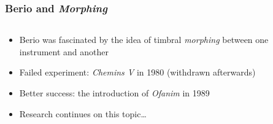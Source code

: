 \begin{frame}
    \frametitle<+- | alert@+->{Berio and \emph{Morphing}}

    \begin{columns}[T]
        \begin{column}{0.7\textwidth}
            \begin{itemize}[<+- | alert@+->]
								\item Berio was fascinated by the idea of timbral \emph{morphing}
												between one instrument and another
								\item Failed experiment: \emph{Chemins V} in 1980 (withdrawn afterwards)
								\item Better success: the introduction of \emph{Ofanim} in 1989
								\item Research continues on this topic\ldots
            \end{itemize}
        \end{column}
        \begin{column}{0.3\textwidth}
        \end{column}
    \end{columns}

\end{frame}

